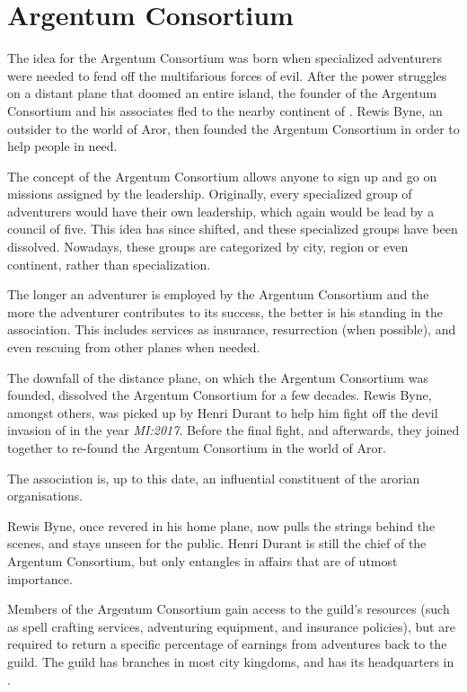 \section{Argentum Consortium}
\label{sec:Argentum Consortium}

The idea for the Argentum Consortium was born when specialized adventurers were
needed to fend off the multifarious forces of evil. After the power struggles on
a distant plane that doomed an entire island, the founder of the Argentum
Consortium and his associates fled to the nearby continent of
. Rewis Byne, an outsider to the world of Aror, then
founded the Argentum Consortium in order to help people in need.

The concept of the Argentum Consortium allows anyone to sign up and go on
missions assigned by the leadership. Originally, every specialized group of
adventurers would have their own leadership, which again would be lead by a
council of five. This idea has since shifted, and these specialized groups have
been dissolved. Nowadays, these groups are categorized by city, region or even
continent, rather than specialization.

The longer an adventurer is employed by the Argentum Consortium and the more the
adventurer contributes to its success, the better is his standing in the
association. This includes services as insurance, resurrection (when possible),
and even rescuing from other planes when needed.

The downfall of the distance plane, on which the Argentum Consortium was
founded, dissolved the Argentum Consortium for a few decades. Rewis Byne,
amongst others, was picked up by Henri Durant to help him fight off the devil
invasion of  in the year \emph{MI:2017}. Before the final
fight, and afterwards, they joined together to re-found the Argentum
Consortium in the world of Aror.

The association is, up to this date, an influential constituent of the arorian
organisations.

Rewis Byne, once revered in his home plane, now pulls the strings behind the
scenes, and stays unseen for the public. Henri Durant is still the chief of the
Argentum Consortium, but only entangles in affairs that are of utmost
importance.

Members of the Argentum Consortium gain access to the guild's resources (such
as spell crafting services, adventuring equipment, and insurance policies),
but are required to return a specific percentage of earnings from adventures
back to the guild. The guild has branches in most city kingdoms, and has its
headquarters in .
